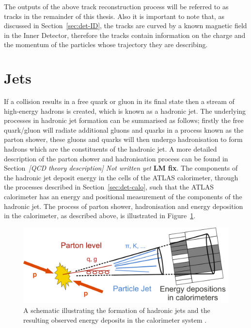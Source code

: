 The outputs of the above track reconstruction process will be referred to as tracks in the remainder of this thesis.
Also it is important to note that, as discussed in Section~\ref{sec:det-ID}, the tracks are curved by a known magnetic field in the Inner Detector,
therefore the tracks contain information on the charge and the momentum of the particles whose trajectory they are describing.

\section{Jets}
\label{sec:obj-jets}

If a collision results in a free quark or gluon in its final state then a stream of high-energy hadrons is created,
which is known as a hadronic jet.
The underlying processes in hadronic jet formation can be summarised as follows;
firstly the free quark/gluon will radiate additional gluons and quarks in a process known as the parton shower,
these gluons and quarks will then undergo hadronisation to form hadrons which are the constituents of the hadronic jet.
A more detailed description of the parton shower and hadronisation process can be found in Section~\textit{[QCD theory description] Not written yet} \textbf{LM fix}.
The components of the hadronic jet deposit energy in the cells of the ATLAS calorimeter, through the processes described in Section~\ref{sec:det-calo},
such that the ATLAS calorimeter has an energy and positional measurement of the components of the hadronic jet.
The process of parton shower, hadronisation and energy deposition in the calorimeter, as described above, is illustrated in Figure~\ref{fig:obj-jets_schem}.

\begin{figure}[!ht]
  \begin{center}
    \includegraphics[width=0.8\linewidth, angle=0]{figs/Objects/jets_schem.png}
  \end{center}
  \caption[A schematic illustrating the formation of hadronic jets and the resulting observed energy deposits in the calorimeter system.]
          {A schematic illustrating the formation of hadronic jets and the resulting observed energy deposits in the calorimeter system \cite{obj-jets_schem}.}
  \label{fig:obj-jets_schem}
\end{figure}

